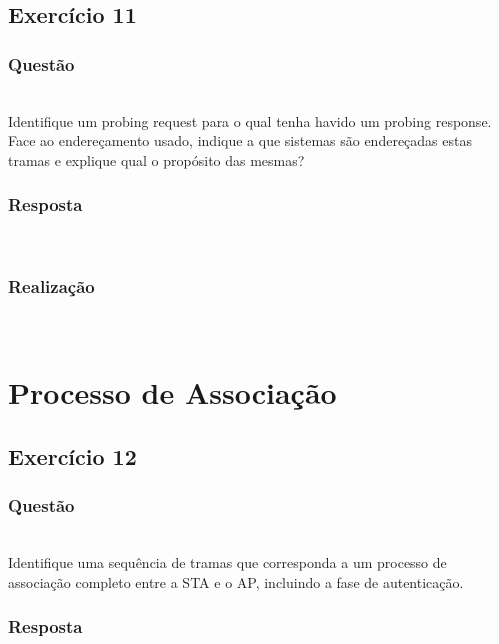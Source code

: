 \documentclass{llncs}
\begin{document}
\clearpage
\subsection{Exercício 11}
\subsubsection{Questão}\rule[-10pt]{0pt}{10pt}\\

Identifique um probing request para o qual tenha havido um probing response. Face ao endereçamento usado, indique a que sistemas são endereçadas estas tramas e explique qual o propósito das mesmas?

\subsubsection{Resposta}\rule[-10pt]{0pt}{10pt}\\



\subsubsection{Realização}\rule[-10pt]{0pt}{10pt}\\



\clearpage

\section{Processo de Associação}
\subsection{Exercício 12}
\subsubsection{Questão}\rule[-10pt]{0pt}{10pt}\\

Identifique uma sequência de tramas que corresponda a um processo de associação completo entre a STA e o AP, incluindo a fase de autenticação.

\subsubsection{Resposta}\rule[-10pt]{0pt}{10pt}\\
\end{document}
